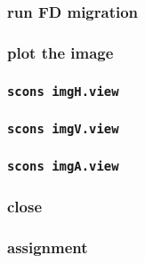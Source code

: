 \begin{frame} \frametitle{run FD migration}
\end{frame}
\cwpnote{}

\begin{frame} \frametitle{plot the image}
\end{frame}
\cwpnote{}

\begin{frame} \frametitle{\texttt{scons imgH.view}}
\end{frame}
\begin{frame} \frametitle{\texttt{scons imgV.view}}
\end{frame}
\begin{frame} \frametitle{\texttt{scons imgA.view}}
\end{frame}

\begin{frame} \frametitle{close}
\end{frame}
\cwpnote{}

\begin{frame}

  
  \vfill


  \vfill
  
  \begin{center}
  \end{center}
  
\end{frame}
\cwpnote{}


\begin{frame} \frametitle{assignment}


\end{frame}
\cwpnote{}

